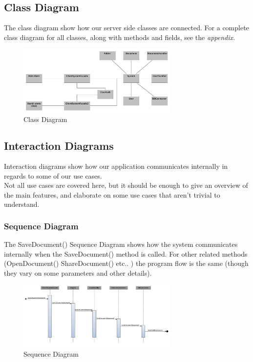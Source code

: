 \documentclass[11pt]{article}
\begin{document}
\subsection{Class Diagram}
\label{sec-3-1}
The class diagram show how our server side classes are connected. For a complete class diagram for all classes, along with methods and fields, see the \emph{appendix.}
\begin{figure}[H]
  		\centering
    	\includegraphics[width=300px]{images/LatestClassDiagram.jpg}
    	\caption{Class Diagram}
\end{figure}
\subsection{Interaction Diagrams}
\label{sec-3-2}
Interaction diagrams show how our application communicates internally in regards to some of our use cases. \\
Not all use cases are covered here, but it should be enough to give an overview of the main features, and elaborate on some use cases that aren't trivial to understand.
\subsubsection{Sequence Diagram}
\label{sec-3-2-1}
The SaveDocument() Sequence Diagram shows how the system communicates internally when the SaveDocument() method is called.
For other related methods (OpenDocument() ShareDocument() etc.. ) the program flow is the same (though they vary on some parameters and other details).
\begin{figure}[H]
  		\centering
    	\includegraphics[width=300px]{images/SequenceDiagram_SaveDocument.jpg}
    	\caption{Sequence Diagram}
\end{figure}
\end{document}
